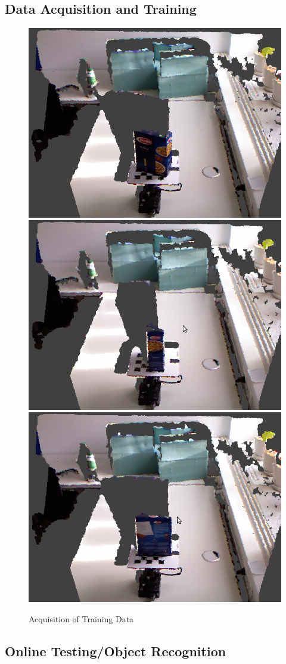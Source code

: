\documentclass[conference]{sty/IEEEtran}
\begin{document}
\subsection{Data Acquisition and Training}
\begin{figure}[htb!]
  \begin{center}
    \includegraphics[width=.45\columnwidth]{figures/rot_table/barilla.png}
\hfill
    \includegraphics[width=.45\columnwidth]{figures/rot_table/barilla1.png} \\
    \includegraphics[width=.45\columnwidth]{figures/rot_table/barilla2.png}
\caption{Acquisition of Training Data}
    \label{fig:data_acquisition}
  \end{center}
\end{figure}
\subsection{Online Testing/Object Recognition}
\end{document}
